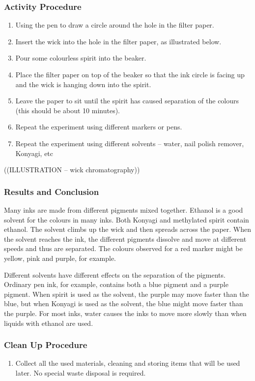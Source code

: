 \subsubsection*{Activity Procedure}
\begin{enumerate}
\item{Using the pen to draw a circle around the hole in the filter paper.}
\item{Insert the wick into the hole in the filter paper, as illustrated below.}
\item{Pour some colourless spirit into the beaker.}
\item{Place the filter paper on top of the beaker so that the ink circle is facing up and the wick is hanging down into the spirit.}
\item{Leave the paper to sit until the spirit has caused separation of the colours (this should be about 10 minutes).}
\item{Repeat the experiment using different markers or pens.}
\item{Repeat the experiment using different solvents -- water, nail polish remover, Konyagi, etc}
\end{enumerate}

((ILLUSTRATION -- wick chromatography))

\subsubsection*{Results and Conclusion}
Many inks are made from different pigments mixed together. Ethanol is a good solvent for the colours in many inks. Both Konyagi and methylated spirit contain ethanol. The solvent climbs up the wick and then spreads across the paper.  When the solvent reaches the ink, the different pigments dissolve and move at different speeds and thus are separated. The colours observed for a red marker might be yellow, pink and purple, for example.

Different solvents have different effects on the separation of the pigments. Ordinary pen ink, for example, contains both a blue pigment and a purple pigment. When spirit is used as the solvent, the purple may move faster than the blue, but when Konyagi is used as the solvent, the blue might move faster than the purple. For most inks, water causes the inks to move more slowly than when liquids with ethanol are used.

\subsubsection*{Clean Up Procedure}
\begin{enumerate}
\item{Collect all the used materials, cleaning and storing items that will be used later. No special waste disposal is required.}
\end{enumerate}

